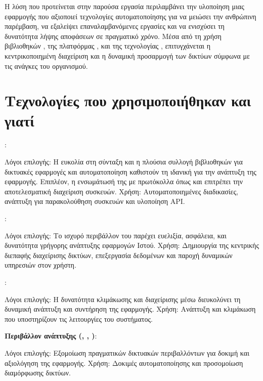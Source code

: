 Η λύση που προτείνεται στην παρούσα εργασία περιλαμβάνει την υλοποίηση μιας εφαρμογής που αξιοποιεί τεχνολογίες αυτοματοποίησης 
για να μειώσει την ανθρώπινη παρέμβαση, να εξαλείψει επαναλαμβανόμενες εργασίες και να ενισχύσει τη δυνατότητα λήψης αποφάσεων σε πραγματικό χρόνο. 
Μέσα από τη χρήση βιβλιοθηκών , της πλατφόρμας , και της τεχνολογίας , επιτυγχάνεται η κεντρικοποιημένη 
διαχείριση και η δυναμική προσαρμογή των δικτύων σύμφωνα με τις ανάγκες του οργανισμού.

\section{Τεχνολογίες που χρησιμοποιήθηκαν και γιατί}


\textbf{}:

Λόγοι επιλογής: Η ευκολία στη σύνταξη και η πλούσια συλλογή βιβλιοθηκών για δικτυακές εφαρμογές και αυτοματοποίηση καθιστούν τη  ιδανική για την ανάπτυξη της εφαρμογής. Επιπλέον, η ενσωμάτωσή της με πρωτόκολλα όπως  και  επιτρέπει την αποτελεσματική διαχείριση συσκευών.
Χρήση: Αυτοματοποιημένες διαδικασίες, ανάπτυξη  για παρακολούθηση συσκευών και υλοποίηση API.

\textbf{}:

Λόγοι επιλογής: Το ισχυρό  περιβάλλον του  παρέχει ευελιξία, ασφάλεια, και δυνατότητα γρήγορης ανάπτυξης εφαρμογών Ιστού.
Χρήση: Δημιουργία της κεντρικής διεπαφής διαχείρισης δικτύων, επεξεργασία δεδομένων και παροχή δυναμικών υπηρεσιών στον χρήστη.

\textbf{}:

Λόγοι επιλογής: Η δυνατότητα κλιμάκωσης και διαχείρισης  μέσω  διευκολύνει τη δυναμική ανάπτυξη και συντήρηση της εφαρμογής.
Χρήση: Ανάπτυξη και κλιμάκωση  που υποστηρίζουν τις λειτουργίες του συστήματος.

\textbf{Περιβάλλον ανάπτυξης (, , )}:

Λόγοι επιλογής: Εξομοίωση πραγματικών δικτυακών περιβαλλόντων για δοκιμή και αξιολόγηση της εφαρμογής.
Χρήση: Δοκιμές αυτοματοποίησης και προσομοίωση διαμόρφωσης δικτύων.


